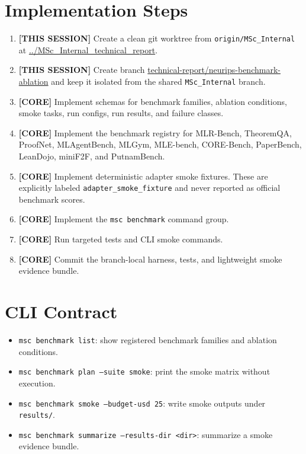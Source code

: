 \documentclass[11pt]{article}
\newcommand{\core}{\textbf{\textcolor{green!45!black}{[CORE]}}}
\newcommand{\done}{\textbf{\textcolor{blue!60!black}{[THIS SESSION]}}}
\begin{document}
\section*{Implementation Steps}

\begin{enumerate}
  \item \done{} Create a clean git worktree from \texttt{origin/MSc\_Internal} at \url{../MSc_Internal_technical_report}.
  \item \done{} Create branch \url{technical-report/neurips-benchmark-ablation} and keep it isolated from the shared \texttt{MSc\_Internal} branch.
  \item \core{} Implement schemas for benchmark families, ablation conditions, smoke tasks, run configs, run results, and failure classes.
  \item \core{} Implement the benchmark registry for MLR-Bench, TheoremQA, ProofNet, MLAgentBench, MLGym, MLE-bench, CORE-Bench, PaperBench, LeanDojo, miniF2F, and PutnamBench.
  \item \core{} Implement deterministic adapter smoke fixtures. These are explicitly labeled \texttt{adapter\_smoke\_fixture} and never reported as official benchmark scores.
  \item \core{} Implement the \texttt{msc benchmark} command group.
  \item \core{} Run targeted tests and CLI smoke commands.
  \item \core{} Commit the branch-local harness, tests, and lightweight smoke evidence bundle.
\end{enumerate}

\section*{CLI Contract}

\begin{itemize}
  \item \texttt{msc benchmark list}: show registered benchmark families and ablation conditions.
  \item \texttt{msc benchmark plan --suite smoke}: print the smoke matrix without execution.
  \item \texttt{msc benchmark smoke --budget-usd 25}: write smoke outputs under \texttt{results/}.
  \item \texttt{msc benchmark summarize --results-dir <dir>}: summarize a smoke evidence bundle.
\end{itemize}
\end{document}
